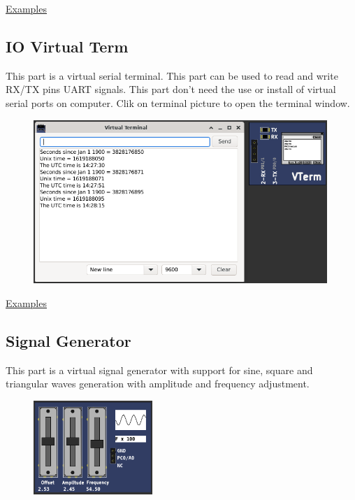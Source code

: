 \href{https://lcgamboa.github.io/picsimlab_examples/Parts.html\#D._Transfer_Function}{Examples}

\subsection{IO Virtual Term} \hypertarget{def:vterm}{}

This part is a virtual serial terminal. This part can be used to read and write RX/TX pins UART signals.
This part don't need the use or install of virtual serial ports on computer.  
Clik on terminal picture to open the terminal window.

\begin{figure}[H]
\center
\includegraphics[width=0.99\textwidth]{img/part_vterm.png} 
\end{figure} 

\href{https://lcgamboa.github.io/picsimlab_examples/Parts.html\#IO_Virtual_Term}{Examples}

\subsection{Signal Generator}

This part is a virtual signal generator with support for sine, square and triangular waves 
generation with amplitude and frequency adjustment.

\begin{figure}[H]
\center
\includegraphics[width=0.4\textwidth]{img/part_sgen.png} 
\end{figure}


